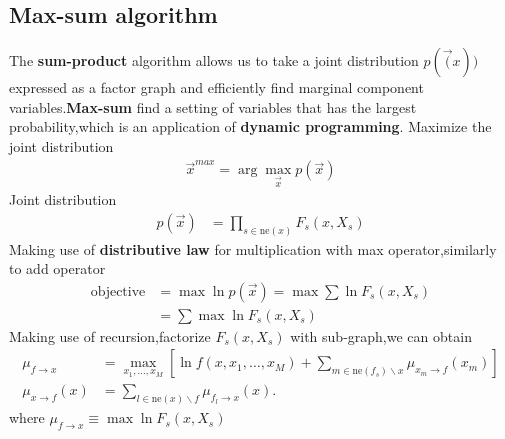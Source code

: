 \subsection{Max-sum algorithm}
The \textbf{sum-product} algorithm allows us to take a joint distribution $p(\vec(x))$ expressed as a factor graph and efficiently find marginal component variables.\textbf{Max-sum} find a setting of variables that has the largest probability,which is an application of \textbf{dynamic programming}.
Maximize the joint distribution
\begin{align}
\vec{x}^{max} = \arg\max_{\vec{x}}p(\vec{x})
\end{align}
Joint distribution
\begin{align}
p(\vec{x}) &= \prod_{s\in \text{ne}(x)}F_s(x,X_s)
\end{align}
Making use of \textbf{distributive law} for multiplication with max operator,similarly to add operator
\begin{align}
\text{objective} &= \max\ln p(\vec{x}) =\max\sum\ln F_s(x,X_s) \\
&=\sum\max\ln F_s(x,X_s)
\end{align}
Making use of recursion,factorize $F_s(x,X_s)$ with sub-graph,we can obtain
\begin{align}
\mu_{f\rightarrow x} &= \max_{x_1,\ldots,x_M}\left[\ln f(x,x_1,\ldots,x_M) + \sum_{m\in \text{ne}(f_s)\backslash x} {\mu_{x_m\rightarrow f}(x_m)} \right] \\
\mu_{x\rightarrow f}(x) &= \sum_{l\in \text{ne}(x)\backslash f}{\mu_{f_l\rightarrow x}}(x).
\end{align}
where $\mu_{f\rightarrow x} \equiv \max\ln F_s(x,X_s)$







